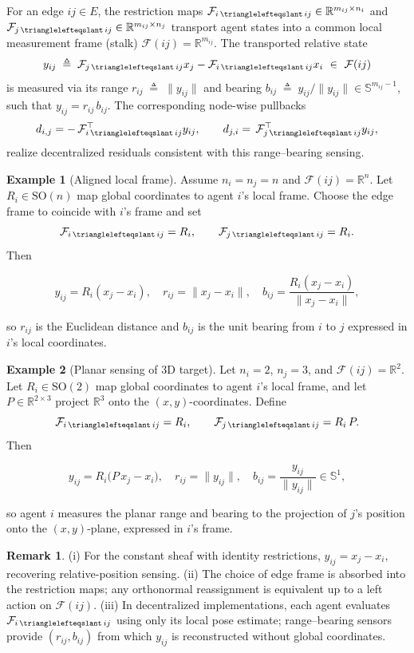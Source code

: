 \documentclass[letterpaper, 10 pt, conference]{ieeeconf}
\newcommand{\R}{\mathbb{R}}
\newcommand{\FF}{\mathcal{F}}
\DeclareMathOperator{\face}{\trianglelefteqslant}
\theoremstyle{definition}
\newtheorem{example}{Example}
\newtheorem{remark}{Remark}
\begin{document}
For an edge $ij\in E$, the restriction maps $\FF_{i\face ij}\in\R^{m_{ij}\times n_i}$ and $\FF_{j\face ij}\in\R^{m_{ij}\times n_j}$ transport agent states into a common local measurement frame (stalk) $\FF(ij)=\R^{m_{ij}}$. The transported relative state
\[
y_{ij}\;\triangleq\;\FF_{j\face ij}x_j-\FF_{i\face ij}x_i\ \in\ \FF(ij)
\]
is measured via its range $r_{ij}\;\triangleq\;\|y_{ij}\|$ and bearing $b_{ij}\;\triangleq\;y_{ij}/\|y_{ij}\| \in\mathbb{S}^{m_{ij}-1}$, such that $y_{ij}=r_{ij}\,b_{ij}$. The corresponding node-wise pullbacks
\[
d_{i,j}=-\,\FF_{i\face ij}^\top y_{ij},
\qquad
d_{j,i}=\,\FF_{j\face ij}^\top y_{ij},
\]
realize decentralized residuals consistent with this range–bearing sensing.

\begin{example}[Aligned local frame]
Assume $n_i=n_j=n$ and $\FF(ij)=\R^n$. Let $R_i\in\mathrm{SO}(n)$ map global coordinates to agent $i$’s local frame. Choose the edge frame to coincide with $i$’s frame and set
\[
\FF_{i\face ij}=R_i,\qquad \FF_{j\face ij}=R_i.
\]
Then
\begin{small}
\[
y_{ij}=R_i(x_j-x_i),
\quad
r_{ij}=\|x_j-x_i\|,
\quad
b_{ij}=\frac{R_i(x_j-x_i)}{\|x_j-x_i\|},
\]
\end{small}so $r_{ij}$ is the Euclidean distance and $b_{ij}$ is the unit bearing from $i$ to $j$ expressed in $i$’s local coordinates.
\end{example}

\begin{example}[Planar sensing of 3D target]
Let $n_i=2$, $n_j=3$, and $\FF(ij)=\R^2$. Let $R_i\in\mathrm{SO}(2)$ map global coordinates to agent $i$’s local frame, and let $P\in\R^{2\times 3}$ project $\R^3$ onto the $(x,y)$-coordinates. Define
\[
\FF_{i\face ij}=R_i,\qquad \FF_{j\face ij}=R_i\,P.
\]
Then
\begin{small}
\[
y_{ij}=R_i\big(P\,x_j - x_i\big),\quad
r_{ij}=\|y_{ij}\|,\quad
b_{ij}=\frac{y_{ij}}{\|y_{ij}\|}\in\mathbb{S}^1,
\]
\end{small}so agent $i$ measures the planar range and bearing to the projection of $j$’s position onto the $(x,y)$-plane, expressed in $i$’s frame.
\end{example}

\begin{remark}
    (i) For the constant sheaf with identity restrictions, $y_{ij}=x_j-x_i$, recovering relative-position sensing. (ii) The choice of edge frame is absorbed into the restriction maps; any orthonormal reassignment is equivalent up to a left action on $\FF(ij)$. (iii) In decentralized implementations, each agent evaluates $\FF_{i\face ij}$ using only its local pose estimate; range–bearing sensors provide $(r_{ij},b_{ij})$ from which $y_{ij}$ is reconstructed without global coordinates.
\end{remark}
\end{document}
